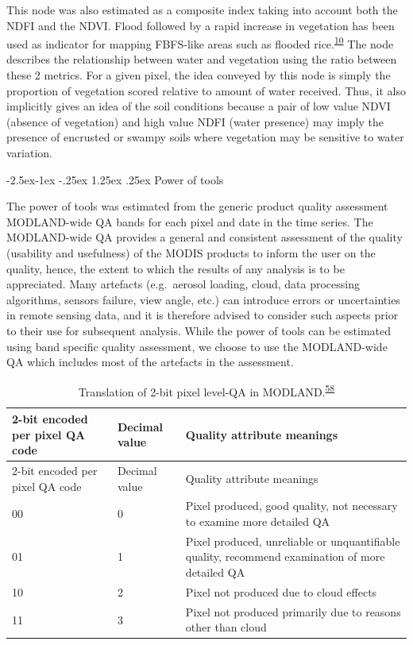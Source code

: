\documentclass[12pt,oneside]{article}
\makeatletter
\renewcommand\paragraph{\@startsection{paragraph}{4}{\z@}%
            {-2.5ex\@plus -1ex \@minus -.25ex}%
            {1.25ex \@plus .25ex}%
            {\normalfont\normalsize\bfseries}}
\makeatother
\begin{document}
This node was also estimated as a composite index taking into account both the NDFI and the NDVI. Flood followed by a rapid increase in vegetation has been used as indicator for mapping FBFS-like areas such as flooded rice.\textsuperscript{\protect\hyperlink{ref-Boschetti_et_al_2014}{10}} The node describes the relationship between water and vegetation using the ratio between these 2 metrics. For a given pixel, the idea conveyed by this node is simply the proportion of vegetation scored relative to amount of water received. Thus, it also implicitly gives an idea of the soil conditions because a pair of low value NDVI (absence of vegetation) and high value NDFI (water presence) may imply the presence of encrusted or swampy soils where vegetation may be sensitive to water variation.

\hypertarget{I525}{%
\paragraph{Power of tools}\label{I525}}

The power of tools was estimated from the generic product quality assessment MODLAND-wide QA bands for each pixel and date in the time series. The MODLAND-wide QA provides a general and consistent assessment of the quality (usability and usefulness) of the MODIS products to inform the user on the quality, hence, the extent to which the results of any analysis is to be appreciated. Many artefacts (e.g.~aerosol loading, cloud, data processing algorithms, sensors failure, view angle, etc.) can introduce errors or uncertainties in remote sensing data, and it is therefore advised to consider such aspects prior to their use for subsequent analysis. While the power of tools can be estimated using band specific quality assessment, we choose to use the MODLAND-wide QA which includes most of the artefacts in the assessment.

\begin{longtable}[]{@{}lll@{}}
\caption{Translation of 2-bit pixel level-QA in MODLAND.\textsuperscript{\protect\hyperlink{ref-Roy_et_al_2002}{58}}}\tabularnewline
\toprule
2-bit encoded per pixel QA code & Decimal value & Quality attribute meanings\tabularnewline
\midrule
\endfirsthead
\toprule
2-bit encoded per pixel QA code & Decimal value & Quality attribute meanings\tabularnewline
\midrule
\endhead
00 & 0 & Pixel produced, good quality, not necessary to examine more detailed QA\tabularnewline
01 & 1 & Pixel produced, unreliable or unquantifiable quality, recommend examination of more detailed QA\tabularnewline
10 & 2 & Pixel not produced due to cloud effects\tabularnewline
11 & 3 & Pixel not produced primarily due to reasons other than cloud\tabularnewline
\bottomrule
\end{longtable}
\end{document}
